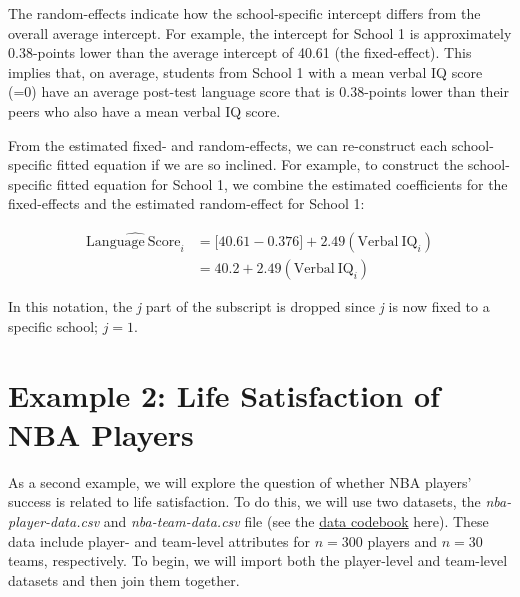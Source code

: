 \documentclass[]{book}
\newenvironment{Shaded}{\begin{snugshade}}{\end{snugshade}}
\newcommand{\CommentTok}[1]{\textcolor[rgb]{0.56,0.35,0.01}{\textit{#1}}}
\newcommand{\DataTypeTok}[1]{\textcolor[rgb]{0.13,0.29,0.53}{#1}}
\newcommand{\KeywordTok}[1]{\textcolor[rgb]{0.13,0.29,0.53}{\textbf{#1}}}
\newcommand{\NormalTok}[1]{#1}
\newcommand{\OperatorTok}[1]{\textcolor[rgb]{0.81,0.36,0.00}{\textbf{#1}}}
\newcommand{\StringTok}[1]{\textcolor[rgb]{0.31,0.60,0.02}{#1}}
\begin{document}
The random-effects indicate how the school-specific intercept differs from the overall average intercept. For example, the intercept for School 1 is approximately 0.38-points lower than the average intercept of 40.61 (the fixed-effect). This implies that, on average, students from School 1 with a mean verbal IQ score (=0) have an average post-test language score that is 0.38-points lower than their peers who also have a mean verbal IQ score.

From the estimated fixed- and random-effects, we can re-construct each school-specific fitted equation if we are so inclined. For example, to construct the school-specific fitted equation for School 1, we combine the estimated coefficients for the fixed-effects and the estimated random-effect for School 1:

\[
\begin{split}
\hat{\mathrm{Language~Score}_{i}} &= \bigg[ 40.61 -0.376 \bigg]+ 2.49(\mathrm{Verbal~IQ}_{i}) \\[1ex]
&= 40.2 + 2.49(\mathrm{Verbal~IQ}_{i}) 
\end{split}
\]

In this notation, the \emph{j} part of the subscript is dropped since \emph{j} is now fixed to a specific school; \(j=1\).

\hypertarget{example-2-life-satisfaction-of-nba-players}{%
\section{Example 2: Life Satisfaction of NBA Players}\label{example-2-life-satisfaction-of-nba-players}}

As a second example, we will explore the question of whether NBA players' success is related to life satisfaction. To do this, we will use two datasets, the \emph{nba-player-data.csv} and \emph{nba-team-data.csv} file (see the \protect\hyperlink{nba}{data codebook} here). These data include player- and team-level attributes for \(n=300\) players and \(n=30\) teams, respectively. To begin, we will import both the player-level and team-level datasets and then join them together.

\begin{Shaded}
\end{Shaded}
\end{document}
